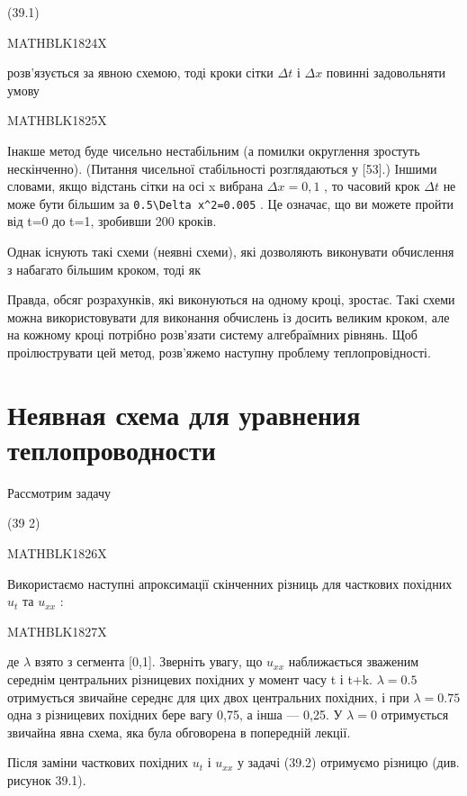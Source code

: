 \documentclass[
  ukrainian,
]{article}
\begin{document}
(39.1)

MATHBLK1824X

розв'язується за явною схемою, тоді кроки сітки \(\Delta t\) і
\(\Delta x\) повинні задовольняти умову

MATHBLK1825X

Інакше метод буде чисельно нестабільним (а помилки округлення зростуть
нескінченно). (Питання чисельної стабільності розглядаються у {[}53{]}.)
Іншими словами, якщо відстань сітки на осі x вибрана \(\Delta x=0,1\) ,
то часовий крок \(\Delta t\) не може бути більшим за
\texttt{0.5\textbackslash{}Delta\ x\^{}2=0.005} . Це означає, що ви
можете пройти від t=0 до t=1, зробивши 200 кроків.

Однак існують такі схеми (неявні схеми), які дозволяють виконувати
обчислення з набагато більшим кроком, тоді як

Правда, обсяг розрахунків, які виконуються на одному кроці, зростає.
Такі схеми можна використовувати для виконання обчислень із досить
великим кроком, але на кожному кроці потрібно розв'язати систему
алгебраїмних рівнянь. Щоб проілюструвати цей метод, розв'яжемо наступну
проблему теплопровідності.

\section{Неявная схема для уравнения
теплопроводности}\label{ux43dux435ux44fux432ux43dux430ux44f-ux441ux445ux435ux43cux430-ux434ux43bux44f-ux443ux440ux430ux432ux43dux435ux43dux438ux44f-ux442ux435ux43fux43bux43eux43fux440ux43eux432ux43eux434ux43dux43eux441ux442ux438}

Рассмотрим задачу

(39 2)

MATHBLK1826X

Використаємо наступні апроксимації скінченних різниць для часткових
похідних \(u_t\) та \(u_{xx}\) :

MATHBLK1827X

де \(\lambda\) взято з сегмента {[}0,1{]}. Зверніть увагу, що \(u_{xx}\)
наближається зваженим середнім центральних різницевих похідних у момент
часу t і t+k. \(\lambda=0.5\) отримується звичайне середнє для цих двох
центральних похідних, і при \(\lambda=0.75\) одна з різницевих похідних
бере вагу 0,75, а інша --- 0,25. У \(\lambda=0\) отримується звичайна
явна схема, яка була обговорена в попередній лекції.

Після заміни часткових похідних \(u_t\) і \(u_{xx}\) у задачі (39.2)
отримуємо різницю (див. рисунок 39.1).
\end{document}
